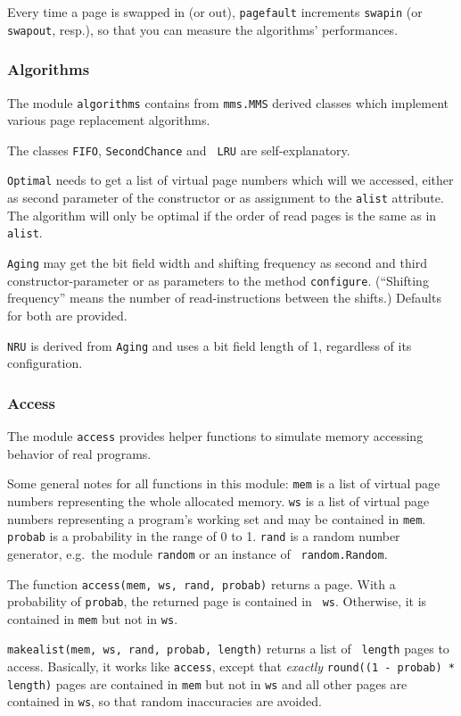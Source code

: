 \documentclass[a4paper,12pt,BCOR2cm,DIV12]{scrartcl}
\begin{document}
Every time a page is swapped in (or out), {\tt pagefault} increments
{\tt swapin} (or {\tt swapout}, resp.), so that you can measure the
algorithms' performances.

\subsubsection{Algorithms}

The module {\tt algorithms} contains from {\tt mms.MMS} derived
classes which implement various page replacement algorithms.

The classes {\tt FIFO}, {\tt SecondChance} and {\tt
LRU} are self-explanatory.

{\tt Optimal} needs to get a list of virtual page numbers which will
we accessed, either as second parameter of the constructor or as
assignment to the {\tt alist} attribute.  The algorithm will only be
optimal if the order of read pages is the same as in {\tt alist}.

{\tt Aging} may get the bit field width and shifting frequency as
second and third constructor-parameter or as parameters to the method
{\tt configure}.  (``Shifting frequency'' means the number of
read-instructions between the shifts.)  Defaults for both are
provided.

{\tt NRU} is derived from {\tt Aging} and uses a bit field length of
1, regardless of its configuration.

\subsubsection{Access}

The module {\tt access} provides helper functions to simulate memory
accessing behavior of real programs.

Some general notes for all functions in this module: {\tt mem} is a
list of virtual page numbers representing the whole allocated memory.
{\tt ws} is a list of virtual page numbers representing a program's
working set and may be contained in {\tt mem}.  {\tt probab} is a
probability in the range of 0 to 1.  {\tt rand} is a random number
generator, e.g.\ the module {\tt random} or an instance of {\tt
random.Random}.

The function {\tt access(mem, ws, rand, probab)} returns a page.  With
a probability of {\tt probab}, the returned page is contained in {\tt
ws}.  Otherwise, it is contained in {\tt mem} but not in {\tt ws}.

{\tt makealist(mem, ws, rand, probab, length)} returns a list of {\tt
length} pages to access.  Basically, it works like {\tt access},
except that \emph{exactly} {\tt round((1 - probab) * length)} pages
are contained in {\tt mem} but not in {\tt ws} and all other pages are
contained in {\tt ws}, so that random inaccuracies are avoided.
\end{document}
